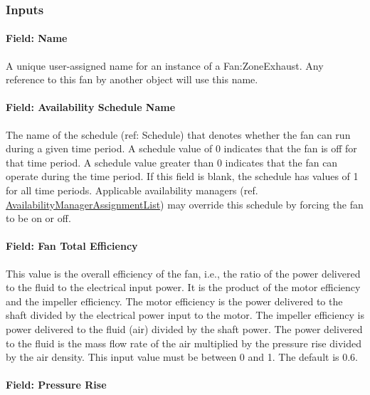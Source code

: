\subsubsection{Inputs}\label{inputs-3-014}

\paragraph{Field: Name}\label{field-name-3-013}

A unique user-assigned name for an instance of a Fan:ZoneExhaust. Any reference to this fan by another object will use this name.

\paragraph{Field: Availability Schedule Name}\label{field-availability-schedule-name-3-002}

The name of the schedule (ref: Schedule) that denotes whether the fan can run during a given time period. A schedule value of 0 indicates that the fan is off for that time period. A schedule value greater than 0 indicates that the fan can operate during the time period. If this field is blank, the schedule has values of 1 for all time periods. Applicable availability managers (ref. \hyperref[availabilitymanagerassignmentlist]{AvailabilityManagerAssignmentList}) may override this schedule by forcing the fan to be on or off.

\paragraph{Field: Fan Total Efficiency}\label{field-fan-total-efficiency-3}

This value is the overall efficiency of the fan, i.e., the ratio of the power delivered to the fluid to the electrical input power. It is the product of the motor efficiency and the impeller efficiency. The motor efficiency is the power delivered to the shaft divided by the electrical power input to the motor. The impeller efficiency is power delivered to the fluid (air) divided by the shaft power. The power delivered to the fluid is the mass flow rate of the air multiplied by the pressure rise divided by the air density. This input value must be between 0 and 1. The default is 0.6.

\paragraph{Field: Pressure Rise}\label{field-pressure-rise-3}

